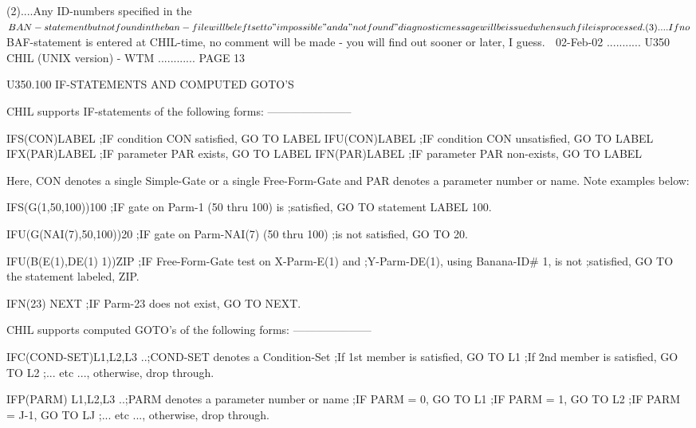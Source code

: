    (2)....Any ID-numbers specified in the $BAN-statement but not found in  the
          ban-file  will  be  left  set  to  "impossible"  and  a  "not found"
          diagnostic message will be issued when such file is processed.
 
   (3)....If no $BAF-statement is entered at CHIL-time,  no  comment  will  be
          made - you will find out sooner or later, I guess.
    
   02-Feb-02 ........... U350  CHIL (UNIX version) - WTM ............ PAGE  13
 
 
   U350.100  IF-STATEMENTS AND COMPUTED GOTO'S
 
   CHIL supports IF-statements of the following forms: -----------------------
 
   IFS(CON)LABEL           ;IF condition CON   satisfied, GO TO LABEL
   IFU(CON)LABEL           ;IF condition CON unsatisfied, GO TO LABEL
   IFX(PAR)LABEL           ;IF parameter PAR      exists, GO TO LABEL
   IFN(PAR)LABEL           ;IF parameter PAR  non-exists, GO TO LABEL
 
   Here,  CON  denotes a single Simple-Gate or a single Free-Form-Gate and PAR
   denotes a parameter number or name. Note examples below:
 
   IFS(G(1,50,100))100     ;IF gate on Parm-1 (50 thru 100) is
                           ;satisfied, GO TO statement LABEL 100.
 
   IFU(G(NAI(7),50,100))20 ;IF gate on Parm-NAI(7) (50 thru 100)
                           ;is not satisfied, GO TO 20.
 
   IFU(B(E(1),DE(1) 1))ZIP ;IF Free-Form-Gate test on X-Parm-E(1) and
                           ;Y-Parm-DE(1), using Banana-ID# 1, is not
                           ;satisfied, GO TO the statement labeled, ZIP.
 
   IFN(23) NEXT            ;IF Parm-23 does not exist, GO TO NEXT.
 
   CHIL supports computed GOTO's of the following forms: ---------------------
 
   IFC(COND-SET)L1,L2,L3 ..;COND-SET denotes a Condition-Set
                           ;If 1st member is satisfied, GO TO L1
                           ;If 2nd member is satisfied, GO TO L2
                           ;... etc ..., otherwise, drop through.
 
   IFP(PARM)    L1,L2,L3 ..;PARM denotes a parameter number or name
                           ;IF PARM = 0,   GO TO L1
                           ;IF PARM = 1,   GO TO L2
                           ;IF PARM = J-1, GO TO LJ
                           ;... etc ..., otherwise, drop through.
 
